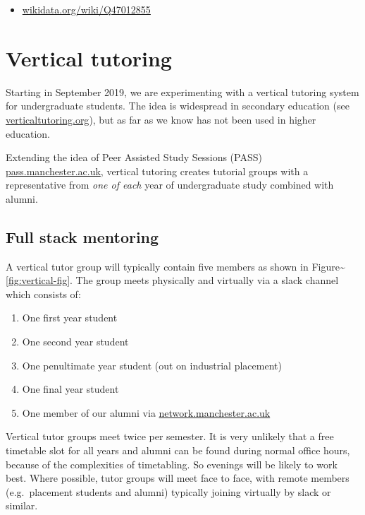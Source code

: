 \documentclass[12pt,]{book}
\providecommand{\tightlist}{%
  \setlength{\itemsep}{0pt}\setlength{\parskip}{0pt}}
\begin{document}
\begin{itemize}
\tightlist
\item
  \href{https://www.wikidata.org/wiki/Q47012855}{wikidata.org/wiki/Q47012855}
\end{itemize}

\hypertarget{vertical-tutoring}{%
\chapter{Vertical tutoring}\label{vertical-tutoring}}

Starting in September 2019, we are experimenting with a vertical tutoring system for undergraduate students. The idea is widespread in secondary education (see \href{https://www.verticaltutoring.org/}{verticaltutoring.org}), but as far as we know has not been used in higher education.

Extending the idea of Peer Assisted Study Sessions (PASS) \href{http://www.pass.manchester.ac.uk}{pass.manchester.ac.uk}, vertical tutoring creates tutorial groups with a representative from \emph{one of each} year of undergraduate study combined with alumni.

\hypertarget{full-stack-mentoring}{%
\section{Full stack mentoring}\label{full-stack-mentoring}}

A vertical tutor group will typically contain five members as shown in Figure\textasciitilde{}\ref{fig:vertical-fig}. The group meets physically and virtually via a slack channel which consists of:

\begin{enumerate}
\def\labelenumi{\arabic{enumi}.}
\tightlist
\item
  One first year student
\item
  One second year student
\item
  One penultimate year student (out on industrial placement)
\item
  One final year student
\item
  One member of our alumni via \href{https://www.network.manchester.ac.uk/}{network.manchester.ac.uk}
\end{enumerate}

Vertical tutor groups meet twice per semester. It is very unlikely that a free timetable slot for all years and alumni can be found during normal office hours, because of the complexities of timetabling. So evenings will be likely to work best. Where possible, tutor groups will meet face to face, with remote members (e.g.~placement students and alumni) typically joining virtually by slack or similar.
\end{document}
